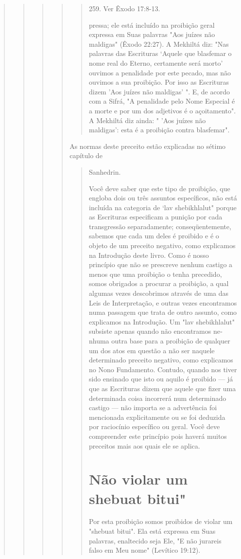 \begin{quote}
\begin{quote}
\begin{quote}
\begin{quote}
\begin{quote}
259. Ver Êxodo 17:8-13.

pressa; ele está incluído na proibição geral expressa em Suas palavras
"Aos juí­zes não maldigas" (Êxodo 22:27). A Mekhiltá diz: "Nas palavras
das Escrituras `Aquele que blasfemar o nome real do Eterno, certamente
será morto' ouvimos a penalidade por este pecado, mas não ouvimos a sua
proibição. Por isso as Escrituras dizem 'Aos juízes não maldigas' ". E,
de acordo com a Sifrá, "A pe­nalidade pelo Nome Especial é a morte e por
um dos adjetivos é o açoitamen­to". A Mekhiltá diz ainda: " 'Aos juízes
não maldigas': esta é a proibição contra blasfemar".
\end{quote}

As normas deste preceito estão explicadas no sétimo capítulo de

\begin{quote}
Sanhedrin.

Você deve saber que este tipo de proibição, que engloba dois ou três
assuntos específicos, não está incluída na categoria de `lav
shebikhlalut" por­que as Escrituras especificam a punição por cada
transgressão separadamente; conseqüentemente, sabemos que cada um deles
é proibido e é o objeto de um preceito negativo, como explicamos na
Introdução deste livro. Como é nosso princípio que não se prescreve
nenhum castigo a menos que uma proibição o tenha precedido, somos
obrigados a procurar a proibição, a qual algumas ve­zes descobrimos
através de uma das Leis de Interpretação, e outras vezes en­contramos
numa passagem que trata de outro assunto, como explicamos na
In­trodução. Um "lav shebikhlalut" subsiste apenas quando não
encontramos ne­nhuma outra base para a proibição de qualquer um dos atos
em questão a não ser naquele determinado preceito negativo, como
explicamos no Nono Funda­mento. Contudo, quando nos tiver sido ensinado
que isto ou aquilo é proibido --- já que as Escrituras dizem que aquele
que fizer uma determinada coisa incor­rerá num determinado castigo ---
não importa se a advertência foi mencionada explicitamente ou se foi
deduzida por raciocínio específico ou geral. Você de­ve compreender este
princípio pois haverá muitos preceitos mais aos quais ele se aplica.

\section{Não violar um shebuat bitui"}

Por esta proibição somos proibidos de violar um "shebuat bitui". Ela
está expressa em Suas palavras, enaltecido seja Ele, "E não jurareis
falso em Meu nome" (Levítico 19:12).


\end{quote}
\end{quote}
\end{quote}
\end{quote}
\end{quote}
